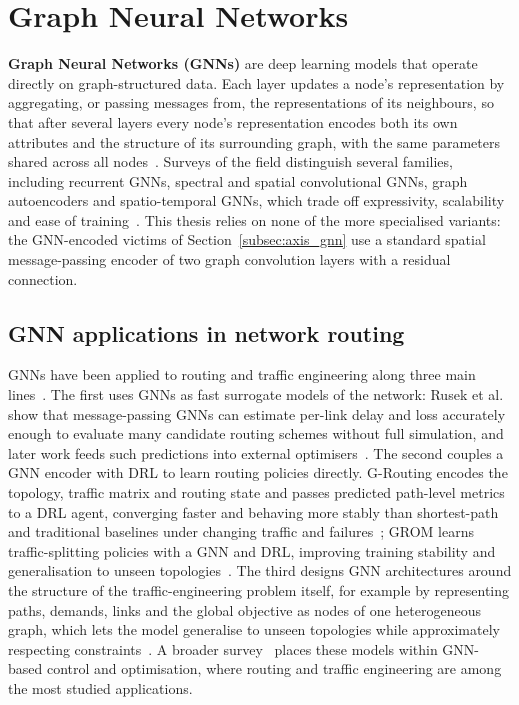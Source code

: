 \section{Graph Neural Networks}
\label{sec:lit_gnn}

\textbf{Graph Neural Networks (GNNs)} are deep learning models that operate directly on
graph-structured data. Each layer updates a node's representation by aggregating, or
passing messages from, the representations of its neighbours, so that after several
layers every node's representation encodes both its own attributes and the structure of
its surrounding graph, with the same parameters shared across all
nodes~\cite{zhou2021graphneuralnetworksreview,zhang2022gnnreview,wu2021gnnreview,chami2022gnnreview}.
Surveys of the field distinguish several families, including recurrent GNNs, spectral
and spatial convolutional GNNs, graph autoencoders and spatio-temporal GNNs, which trade
off expressivity, scalability and ease of
training~\cite{zhou2021graphneuralnetworksreview,wu2021gnnreview}. This thesis relies on
none of the more specialised variants: the GNN-encoded victims of
Section~\ref{subsec:axis_gnn} use a standard spatial message-passing encoder of two graph
convolution layers with a residual connection.

\subsection{GNN applications in network routing}
\label{subsec:lit_gnn_routing}

GNNs have been applied to routing and traffic engineering along three main
lines~\cite{jianggraph}. The first uses GNNs as fast surrogate models of the network:
Rusek et al.~\cite{rusek2019unveiling} show that message-passing GNNs can estimate
per-link delay and loss accurately enough to evaluate many candidate routing schemes
without full simulation, and later work feeds such predictions into external
optimisers~\cite{jianggraph}. The second couples a GNN encoder with DRL to learn routing
policies directly. G-Routing encodes the topology, traffic matrix and routing state and
passes predicted path-level metrics to a DRL agent, converging faster and behaving more
stably than shortest-path and traditional baselines under changing traffic and
failures~\cite{wei2023grouting}; GROM learns traffic-splitting policies with a GNN and
DRL, improving training stability and generalisation to unseen
topologies~\cite{Ding2024grom}. The third designs GNN architectures around the structure
of the traffic-engineering problem itself, for example by representing paths, demands,
links and the global objective as nodes of one heterogeneous graph, which lets the model
generalise to unseen topologies while approximately respecting
constraints~\cite{zhou2025trafficengineeringlargescalenetworks}. A broader
survey~\cite{jiang2024graph} places these models within GNN-based control and
optimisation, where routing and traffic engineering are among the most studied
applications.

